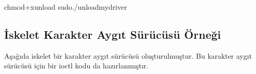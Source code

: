 \documentclass[a4paper,10pt,turkish]{sphinxmanual}
\begin{document}
\begin{sphinxVerbatim}[commandchars=\\\{\}]
\PYGZdl{}chmod+xunload
\PYGZdl{}sudo./unloadmydriver
\end{sphinxVerbatim}


\subsection{İskelet Karakter Aygıt Sürücüsü Örneği}
\label{\detokenize{processcontrolblock:iskelet-karakter-aygit-surucusu-ornegi}}
\sphinxAtStartPar
Aşağıda iskelet bir karakter aygıt sürücüsü oluşturulmuştur. Bu karakter aygıt sürücüsü için bir ioctl
kodu da hazırlanmıştır.

\sphinxAtStartPar
{}

\begin{sphinxVerbatim}[commandchars=\\\{\}]



\end{sphinxVerbatim}

\sphinxAtStartPar
{}
\end{document}

